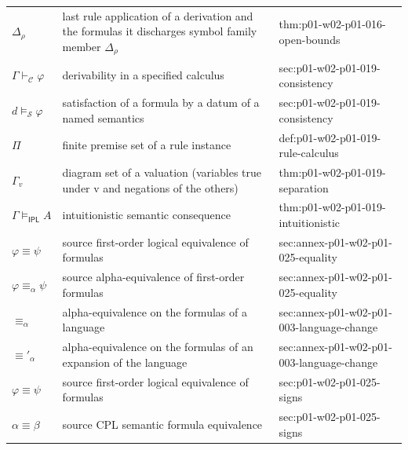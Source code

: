 \begin{longtable}{@{}p{}p{}p{}@{}}
\(\Delta_\rho\) & last rule application of a derivation and the formulas it discharges symbol family member \(\Delta_\rho\) & thm:\allowbreak{}p01-\allowbreak{}w02-\allowbreak{}p01-\allowbreak{}016-\allowbreak{}open-\allowbreak{}bounds \\
\(\Gamma\vdash_{\mathcal C}\varphi\) & derivability in a specified calculus & sec:\allowbreak{}p01-\allowbreak{}w02-\allowbreak{}p01-\allowbreak{}019-\allowbreak{}consistency \\
\(d\models_{\mathcal S}\varphi\) & satisfaction of a formula by a datum of a named semantics & sec:\allowbreak{}p01-\allowbreak{}w02-\allowbreak{}p01-\allowbreak{}019-\allowbreak{}consistency \\
\(\Pi\) & finite premise set of a rule instance & def:\allowbreak{}p01-\allowbreak{}w02-\allowbreak{}p01-\allowbreak{}019-\allowbreak{}rule-\allowbreak{}calculus \\
\(\Gamma_v\) & diagram set of a valuation (variables true under v and negations of the others) & thm:\allowbreak{}p01-\allowbreak{}w02-\allowbreak{}p01-\allowbreak{}019-\allowbreak{}separation \\
\(\Gamma\models_{\mathsf{IPL}}A\) & intuitionistic semantic consequence & thm:\allowbreak{}p01-\allowbreak{}w02-\allowbreak{}p01-\allowbreak{}019-\allowbreak{}intuitionistic \\
\(\varphi\equiv\psi\) & source first-order logical equivalence of formulas & sec:\allowbreak{}annex-\allowbreak{}p01-\allowbreak{}w02-\allowbreak{}p01-\allowbreak{}025-\allowbreak{}equality \\
\(\varphi\equiv_\alpha\psi\) & source alpha-equivalence of first-order formulas & sec:\allowbreak{}annex-\allowbreak{}p01-\allowbreak{}w02-\allowbreak{}p01-\allowbreak{}025-\allowbreak{}equality \\
\(\equiv_\alpha\) & alpha-equivalence on the formulas of a language & sec:\allowbreak{}annex-\allowbreak{}p01-\allowbreak{}w02-\allowbreak{}p01-\allowbreak{}003-\allowbreak{}language-\allowbreak{}change \\
\(\equiv'_\alpha\) & alpha-equivalence on the formulas of an expansion of the language & sec:\allowbreak{}annex-\allowbreak{}p01-\allowbreak{}w02-\allowbreak{}p01-\allowbreak{}003-\allowbreak{}language-\allowbreak{}change \\
\(\varphi\equiv\psi\) & source first-order logical equivalence of formulas & sec:\allowbreak{}p01-\allowbreak{}w02-\allowbreak{}p01-\allowbreak{}025-\allowbreak{}signs \\
\(\alpha\equiv\beta\) & source CPL semantic formula equivalence & sec:\allowbreak{}p01-\allowbreak{}w02-\allowbreak{}p01-\allowbreak{}025-\allowbreak{}signs \\

\end{longtable}
